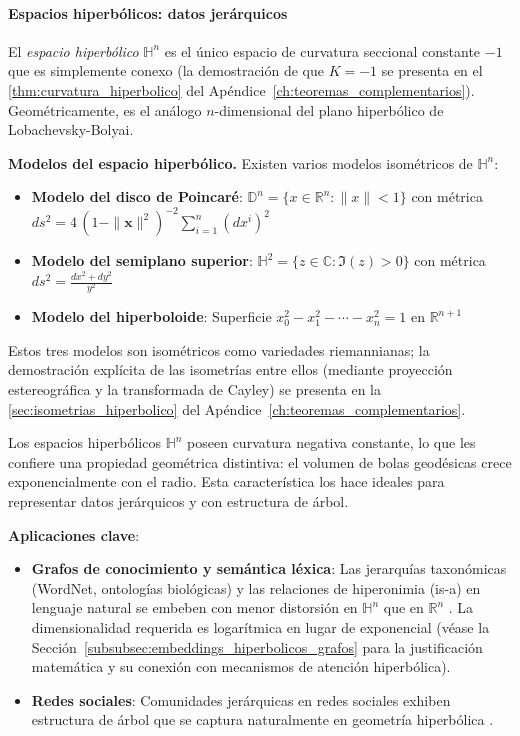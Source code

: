 \paragraph{Espacios hiperbólicos: datos jerárquicos}

\begin{definition}\label{def:espacio_hiperbolico}
El \textit{espacio hiperbólico} $\mathbb{H}^n$ es el único espacio de curvatura seccional constante $-1$ que es simplemente conexo (la demostración de que $K = -1$ se presenta en el \autoref{thm:curvatura_hiperbolico} del Apéndice~\ref{ch:teoremas_complementarios}). Geométricamente, es el análogo $n$-dimensional del plano hiperbólico de Lobachevsky-Bolyai.
\end{definition}

\textbf{Modelos del espacio hiperbólico.}\label{rem:modelos_hiperbolico} Existen varios modelos isométricos de $\mathbb{H}^n$:
\begin{itemize}
    \item \textbf{Modelo del disco de Poincaré}: $\mathbb{D}^n = \{x \in \mathbb{R}^n : \|x\| < 1\}$
          con métrica $ds^2 = 4\,(1 - \|\mathbf{x}\|^2)^{-2} \sum_{i=1}^n (dx^i)^2$
    \item \textbf{Modelo del semiplano superior}: $\mathbb{H}^2 = \{z \in \mathbb{C} : \Im(z) > 0\}$
          con métrica $ds^2 = \frac{dx^2 + dy^2}{y^2}$
    \item \textbf{Modelo del hiperboloide}: Superficie $x_0^2 - x_1^2 - \cdots - x_n^2 = 1$ en $\mathbb{R}^{n+1}$
\end{itemize}

Estos tres modelos son isométricos como variedades riemannianas; la demostración explícita de las isometrías entre ellos (mediante proyección estereográfica y la transformada de Cayley) se presenta en la \autoref{sec:isometrias_hiperbolico} del Apéndice~\ref{ch:teoremas_complementarios}.

Los espacios hiperbólicos $\mathbb{H}^n$ poseen curvatura negativa constante, lo que les confiere una propiedad geométrica distintiva: el volumen de bolas geodésicas crece exponencialmente con el radio. Esta característica los hace ideales para representar datos jerárquicos y con estructura de árbol.

\textbf{Aplicaciones clave}:
\begin{itemize}
    \item \textbf{Grafos de conocimiento y semántica léxica}: Las jerarquías taxonómicas (WordNet, ontologías biológicas) y las relaciones de hiperonimia (is-a) en lenguaje natural se embeben con menor distorsión en $\mathbb{H}^n$ que en $\mathbb{R}^n$ \citep{nickel2017poincare}. La dimensionalidad requerida es logarítmica en lugar de exponencial (véase la Sección~\ref{subsubsec:embeddings_hiperbolicos_grafos} para la justificación matemática y su conexión con mecanismos de atención hiperbólica).

    \item \textbf{Redes sociales}: Comunidades jerárquicas en redes sociales exhiben estructura de árbol que se captura naturalmente en geometría hiperbólica \citep{krioukov2010hyperbolic}.
\end{itemize}

